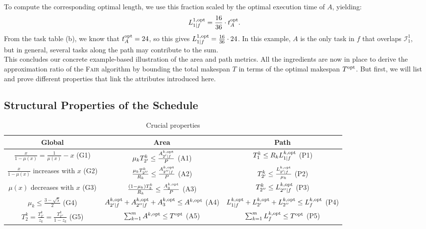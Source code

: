 \documentclass{article}
\newcommand\opt{\textnormal{opt}\xspace}
\begin{document}
To compute the corresponding optimal length, we use this fraction scaled by the optimal execution time of \( A \), yielding:
\[
L_{1|f}^{1,\opt} = \frac{16}{36} \cdot t_A^{\opt}.
\]
From the task table (b), we know that \( t_A^{\opt} = 24 \), so this gives \( L_{1|f}^{1,\opt} = \frac{16}{36} \cdot 24 \). In this example, \( A \) is the only task in \( f \) that overlaps \(\mathcal{I}_1^1\), but in general, several tasks along the path may contribute to the sum.\\


This concludes our concrete example-based illustration of the area and path metrics. All the ingredients are now in place to derive the approximation ratio of the \textsc{Fair} algorithm by bounding the total makespan \( T \) in terms of the optimal makespan \( T^{\opt} \). But first, we will list and prove different properties that link the attributes introduced here.




\subsection{Structural Properties of the Schedule}
\begin{table}[h]
\centering
\caption{Crucial properties}
\label{tab.prop}
\renewcommand{\arraystretch}{2}
\begin{tabular}{|c|c|c|}
\hline
\textbf{Global} & \textbf{Area} & \textbf{Path} \\
\hline
\(\frac{x}{1-\mu(x)} = \frac{1}{\mu(x)} - x\) \hfill (G1) & \(\mu_k T_{2'}^k \leq \frac{A_{2'|f}^{k,\opt}}{P}\) \hfill (A1) & \(T_1^k \leq R_k L_{1|f}^{k,\opt}\) \hfill (P1) \\
\hline
\(\frac{x}{1-\mu(x)}\) increases with \(x\) \hfill  (G2) & \(\frac{\mu_k T_{2''}^k}{R_k} \leq \frac{A_{2''|f}^{k,\opt}}{P}\) \hfill (A2) & \(T_{2'}^k \leq \frac{L_{2'|f}^{k,\opt}}{\mu_k}\) \hfill (P2) \\
\hline
\(\mu(x)\) decreases with \(x\) \hfill(G3) & \(\frac{(1 - \mu_k) T_3^k}{R_k} \leq \frac{A_3^{k,\opt}}{P}\) \hfill (A3) & \(T_{2''}^k \leq L_{2''|f}^{k,\opt}\) \hfill (P3) \\
\hline
\(\mu_k \leq \frac{3 - \sqrt{5}}{2}\)
 \hfill (G4) & \(A_{2'|f}^{k,\opt} + A_{2''|f}^{k,\opt} + A_3^{k,\opt} \leq A^{k,\opt}\) \hfill (A4) & \(L_{1|f}^{k,\opt} + L_{2'}^{k,\opt} + L_{2''}^{k,\opt} \leq L_f^{k,\opt}\) \hfill (P4) \\
\hline
\(T_2^k = \frac{T_{2'}^k}{z_k} = \frac{T_{2''}^k}{1 - z_k}\) \hfill (G5) & \(\sum_{k=1}^m A^{k,\opt} \leq T^{\opt}\) \hfill (A5) & \(\sum_{k=1}^m L_f^{k,\opt} \leq T^{\opt}\) \hfill (P5) \\
\hline
\end{tabular}
\end{table}
\end{document}
